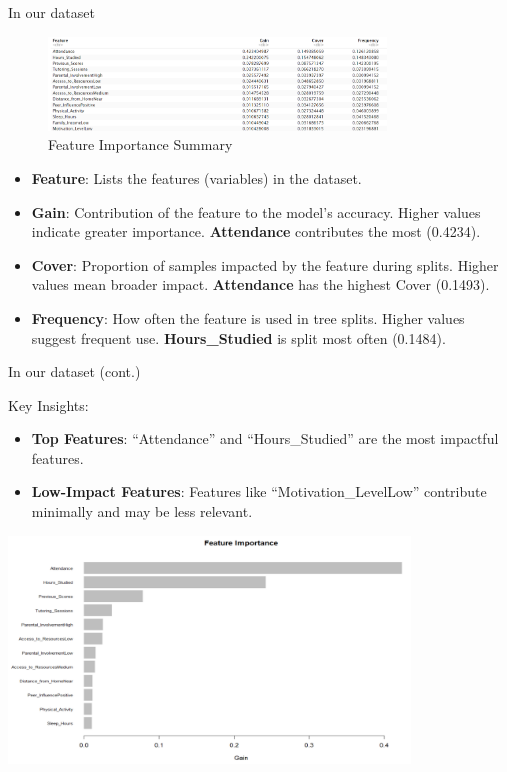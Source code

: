 \documentclass[
  ignorenonframetext,
]{beamer}
\providecommand{\tightlist}{%
  \setlength{\itemsep}{0pt}\setlength{\parskip}{0pt}}\usepackage{longtable,booktabs,array}
\begin{document}
\begin{frame}{In our dataset}
\label{in-our-dataset}
\begin{figure}[H]

{\centering \includegraphics[width=0.8\textwidth,height=\textheight]{gbm_visual3.png}

}

\caption{Feature Importance Summary}

\end{figure}%

\begin{itemize}
\tightlist
\item
  \textbf{Feature}: Lists the features (variables) in the dataset.
\item
  \textbf{Gain}: Contribution of the feature to the model's accuracy.
  Higher values indicate greater importance. \textbf{Attendance}
  contributes the most (0.4234).
\item
  \textbf{Cover}: Proportion of samples impacted by the feature during
  splits. Higher values mean broader impact. \textbf{Attendance} has the
  highest Cover (0.1493).
\item
  \textbf{Frequency}: How often the feature is used in tree splits.
  Higher values suggest frequent use. \textbf{Hours\_Studied} is split
  most often (0.1484).
\end{itemize}
\end{frame}

\begin{frame}{In our dataset (cont.)}
\label{in-our-dataset-cont.}
\begin{block}{Key Insights:}
\label{key-insights}
\begin{itemize}
\tightlist
\item
  \textbf{Top Features}: ``Attendance'' and ``Hours\_Studied'' are the
  most impactful features.
\item
  \textbf{Low-Impact Features}: Features like ``Motivation\_LevelLow''
  contribute minimally and may be less relevant.
\end{itemize}

\includegraphics[width=0.8\textwidth,height=\textheight]{gbm_visual2.png}
\end{block}
\end{frame}
\end{document}
